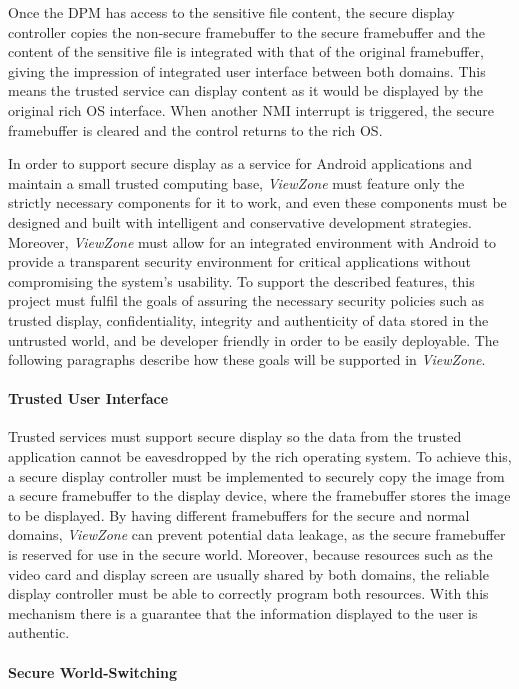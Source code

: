 Once the \ac{DPM} has access to the sensitive file content, the secure display controller copies the non-secure framebuffer to the secure framebuffer and the content of the sensitive file is integrated with that of the original framebuffer, giving the impression of integrated user interface between both domains. This means the trusted service can display content as it would be displayed by the original rich OS interface. When another \ac{NMI} interrupt is triggered, the secure framebuffer is cleared and the control returns to the rich OS.

In order to support secure display as a service for Android applications and maintain a small trusted computing base, \emph{ViewZone} must feature only the strictly necessary components for it to work, and even these components must be designed and built with intelligent and conservative development strategies. Moreover, \emph{ViewZone} must allow for an integrated environment with Android to provide a transparent security environment for critical applications without compromising the system's usability. To support the described features, this project must fulfil the goals of assuring the necessary security policies such as trusted display, confidentiality, integrity and authenticity of data stored in the untrusted world, and be developer friendly in order to be easily deployable. The following paragraphs describe how these goals will be supported in \emph{ViewZone}.

\paragraph{\textbf{Trusted User Interface}}
Trusted services must support secure display so the data from the trusted application cannot be eavesdropped by the rich operating system. To achieve this, a secure display controller must be implemented to securely copy the image from a secure framebuffer to the display device, where the framebuffer stores the image to be displayed. By having different framebuffers for the secure and normal domains, \emph{ViewZone} can prevent potential data leakage, as the secure framebuffer is reserved for use in the secure world. Moreover, because resources such as the video card and display screen are usually shared by both domains, the reliable display controller must be able to correctly program both resources. With this mechanism there is a guarantee that the information displayed to the user is authentic.

\paragraph{\textbf{Secure World-Switching}}


